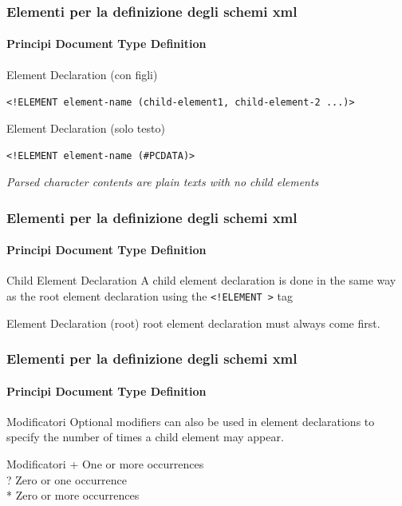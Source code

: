 \begin{frame}
    \frametitle{Elementi per la definizione degli schemi xml}
    \framesubtitle{Principi Document Type Definition}
    \addtocounter{nframe}{1}

    \begin{block}{Element Declaration (con figli)}
        \begin{center}\texttt{<!ELEMENT element-name (child-element1, child-element-2 ...)>}\end{center}
    \end{block}

    \begin{block}{Element Declaration (solo testo)}
    \begin{center}\texttt{<!ELEMENT element-name (\#PCDATA)>}\end{center}
    \end{block}
    \textit{Parsed character contents are plain texts with no child elements}
\end{frame}

\begin{frame}
    \frametitle{Elementi per la definizione degli schemi xml}
    \framesubtitle{Principi Document Type Definition}
    \addtocounter{nframe}{1}

    \begin{block}{Child Element Declaration}
        A child element declaration is done in the same way as the root element declaration using the \texttt{<!ELEMENT >} tag
    \end{block}

    \begin{block}{Element Declaration (root)}
     root element declaration must always come first.
    \end{block}
\end{frame}


\begin{frame}
    \frametitle{Elementi per la definizione degli schemi xml}
    \framesubtitle{Principi Document Type Definition}
    \addtocounter{nframe}{1}

    \begin{block}{Modificatori}
        Optional modifiers can also be used in element declarations to specify the
        number of times a child element may appear.
    \end{block}

    \begin{block}{Modificatori}
     + One or more occurrences\\ 
     ? Zero or one occurrence\\
     * Zero or more occurrences
    \end{block}
\end{frame}

